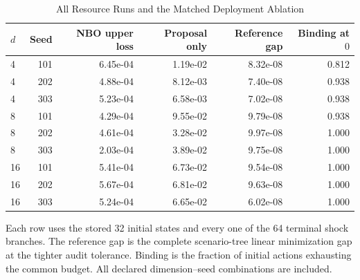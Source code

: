 \begin{table}[tbp]
\centering
\caption{All Resource Runs and the Matched Deployment Ablation}
\label{tab:resource_all}
\small
\begin{tabular}{@{}lrrrrr@{}}
\toprule
$d$ & Seed & NBO upper loss & Proposal only & Reference gap & Binding at $0$ \\
\midrule
4 & 101 & 6.45e-04 & 1.19e-02 & 8.32e-08 & 0.812 \\
4 & 202 & 4.88e-04 & 8.12e-03 & 7.40e-08 & 0.938 \\
4 & 303 & 5.23e-04 & 6.58e-03 & 7.02e-08 & 0.938 \\
8 & 101 & 4.29e-04 & 9.55e-02 & 9.79e-08 & 0.938 \\
8 & 202 & 4.61e-04 & 3.28e-02 & 9.97e-08 & 1.000 \\
8 & 303 & 2.03e-04 & 3.89e-02 & 9.75e-08 & 1.000 \\
16 & 101 & 5.41e-04 & 6.73e-02 & 9.54e-08 & 1.000 \\
16 & 202 & 5.67e-04 & 6.81e-02 & 9.63e-08 & 1.000 \\
16 & 303 & 5.24e-04 & 6.65e-02 & 6.02e-08 & 1.000 \\
\bottomrule
\end{tabular}
\par\smallskip\begin{minipage}{\linewidth}\footnotesize Each row uses the stored 32 initial states and every one of the 64 terminal shock branches. The reference gap is the complete scenario-tree linear minimization gap at the tighter audit tolerance. Binding is the fraction of initial actions exhausting the common budget. All declared dimension--seed combinations are included.\end{minipage}
\end{table}

